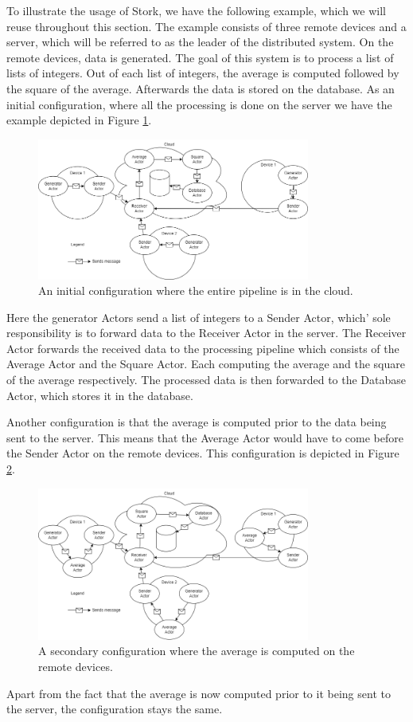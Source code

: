 \documentclass[a4paper]{article}
\begin{document}
To illustrate the usage of Stork, we have the following example, which we will reuse throughout this section. The example consists of three remote devices and a server, which will be referred to as the leader of the distributed system. On the remote devices, data is generated. The goal of this system is to process a list of lists of integers. Out of each list of integers, the average is computed followed by the square of the average. Afterwards the data is stored on the database. As an initial configuration, where all the processing is done on the server we have the example depicted in Figure \ref{fig:config1}.
\begin{figure}[H]
    \centering
    \includegraphics[width=0.8\textwidth]{systemexample1.png}
    \caption{An initial configuration where the entire pipeline is in the cloud.}
    \label{fig:config1}
\end{figure}
Here the generator Actors send a list of integers to a Sender Actor, which' sole responsibility is to forward data to the Receiver Actor in the server. The Receiver Actor forwards the received data to the processing pipeline which consists of the Average Actor and the Square Actor. Each computing the average and the square of the average respectively. The processed data is then forwarded to the Database Actor, which stores it in the database.

Another configuration is that the average is computed prior to the data being sent to the server. This means that the Average Actor would have to come before the Sender Actor on the remote devices. This configuration is depicted in Figure \ref{fig:config2}.
\begin{figure}[H]
    \centering
    \includegraphics[width=0.8\textwidth]{systemexample2.png}
    \caption{A secondary configuration where the average is computed on the remote devices.}
    \label{fig:config2}
\end{figure}
Apart from the fact that the average is now computed prior to it being sent to the server, the configuration stays the same.
\end{document}
